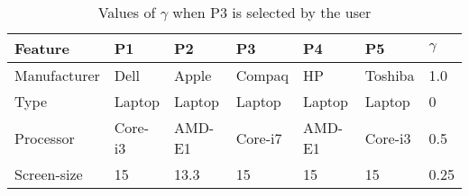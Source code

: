 \begin{table}
\renewcommand{\arraystretch}{1.5}
 \centering
 \begin{tabular}{l l l l l l |l|}
  \hline \hline
   Feature & P1 & P2 & P3 & P4 & P5 & $\gamma$ \\
  \hline
  Manufacturer & Dell & Apple & Compaq & HP & Toshiba & 1.0 \\
  Type & Laptop & Laptop & Laptop & Laptop & Laptop & 0 \\
  Processor & Core-i3 & AMD-E1 & Core-i7 & AMD-E1 & Core-i3 & 0.5\\
  Screen-size & 15 & 13.3 & 15 & 15 & 15 & 0.25\\
  \hline \hline
 \end{tabular}
 \caption{Values of $\gamma$ when P3 is selected by the user}
 \label{tab:wMLT}
\end{table}


